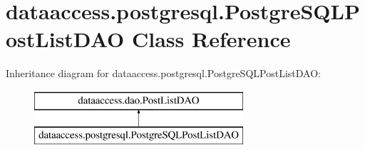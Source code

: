 \hypertarget{classdataaccess_1_1postgresql_1_1_postgre_s_q_l_post_list_d_a_o}{\section{dataaccess.\-postgresql.\-Postgre\-S\-Q\-L\-Post\-List\-D\-A\-O \-Class \-Reference}
\label{classdataaccess_1_1postgresql_1_1_postgre_s_q_l_post_list_d_a_o}
}
\-Inheritance diagram for dataaccess.\-postgresql.\-Postgre\-S\-Q\-L\-Post\-List\-D\-A\-O\-:\begin{figure}[H]
\begin{center}
\leavevmode
\includegraphics[height=2.000000cm]{classdataaccess_1_1postgresql_1_1_postgre_s_q_l_post_list_d_a_o}
\end{center}
\end{figure}

